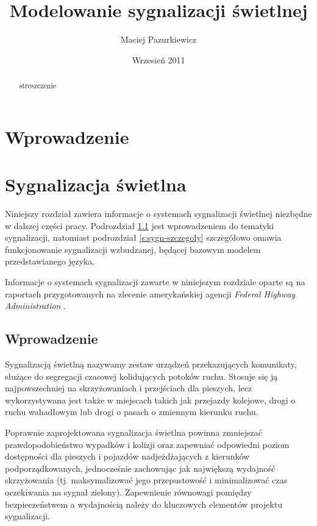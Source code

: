 \documentclass{pracamgr}
\author{Maciej Pazurkiewicz}
\title{Modelowanie sygnalizacji świetlnej}
\date{Wrzesień 2011}
\theoremstyle{plain}
\begin{document}
\maketitle

\begin{abstract} streszczenie
\end{abstract}

\tableofcontents

\chapter*{Wprowadzenie} 

\chapter{Sygnalizacja świetlna}
\label{c:sygnalizacja}

Niniejszy rozdział zawiera informacje o systemach sygnalizacji
świetlnej niezbędne w dalszej części pracy. Podrozdział
\ref{s:sygn-wprowadzenie} jest wprowadzeniem do tematyki sygnalizacji,
natomiast podrozdział \ref{s:sygn-szczegoly} szczegółowo omawia
funkcjonowanie sygnalizacji wzbudzanej, będącej bazowym modelem
przedstawianego języka.

Informacje o systemach sygnalizacji zawarte w niniejszym rozdziale
oparte są na raportach przygotowanych na zlecenie amerykańskiej
agencji \emph{Federal Highway Administration} \cite{timing}
\cite{handbook}.

\section{Wprowadzenie}
\label{s:sygn-wprowadzenie}

Sygnalizacją świetlną nazywamy zestaw urządzeń przekazujących
komunikaty, służące do segregacji czasowej kolidujących potoków
ruchu. Stosuje się ją najpowszechniej na skrzyżowaniach i przejściach
dla pieszych, lecz wykorzystywana jest także w miejscach takich jak
przejazdy kolejowe, drogi o ruchu wahadłowym lub drogi o pasach o
zmiennym kierunku ruchu.

Poprawnie zaprojektowana sygnalizacja świetlna powinna zmniejszać
prawdopodobieństwo wypadków i kolizji oraz zapewniać odpowiedni poziom
dostępności dla pieszych i pojazdów nadjeżdżających z kierunków
podporządkowanych, jednocześnie zachowując jak największą wydajność
skrzyżowania (tj. maksymalizować jego przepustowość i minimalizować
czas oczekiwania na sygnał zielony).  Zapewnienie równowagi pomiędzy
bezpieczeństwem a wydajnością należy do kluczowych elementów projektu
sygnalizacji.
\end{document}
